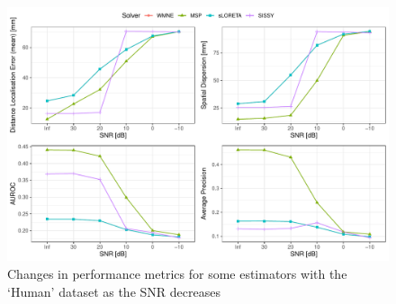 \begin{figure}
    \centering
    \includegraphics[width=0.9\linewidth]{img_stats/SNRdegradation_EvalMetrics_Protocol04_30.pdf}
    \caption{Changes in performance metrics for some estimators with the `Human' dataset as the SNR decreases}
    \label{fig:noise_degradation}
\end{figure}


%

%


